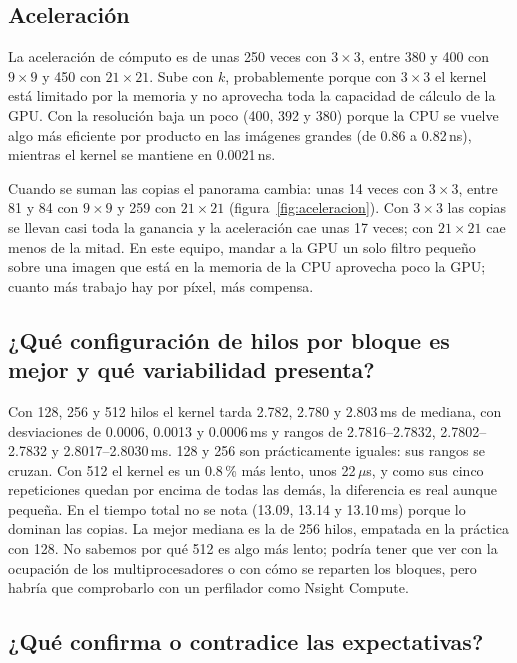 \documentclass[12pt]{article}
\begin{document}
\subsection{Aceleración}

La aceleración de cómputo es de unas 250 veces con $3\times3$, entre 380 y 400 con $9\times9$ y
450 con $21\times21$. Sube con $k$, probablemente porque con $3\times3$ el kernel está limitado
por la memoria y no aprovecha toda la capacidad de cálculo de la GPU. Con la resolución baja un
poco (400, 392 y 380) porque la CPU se vuelve algo más eficiente por producto en las imágenes
grandes (de 0.86 a 0.82\,ns), mientras el kernel se mantiene en 0.0021\,ns.

Cuando se suman las copias el panorama cambia: unas 14 veces con $3\times3$, entre 81 y 84 con
$9\times9$ y 259 con $21\times21$ (figura~\ref{fig:aceleracion}). Con $3\times3$ las copias se
llevan casi toda la ganancia y la aceleración cae unas 17 veces; con $21\times21$ cae menos de
la mitad. En este equipo, mandar a la GPU un solo filtro pequeño sobre una imagen que está en
la memoria de la CPU aprovecha poco la GPU; cuanto más trabajo hay por píxel, más compensa.

\subsection{¿Qué configuración de hilos por bloque es mejor y qué variabilidad presenta?}

Con 128, 256 y 512 hilos el kernel tarda 2.782, 2.780 y 2.803\,ms de mediana, con desviaciones
de 0.0006, 0.0013 y 0.0006\,ms y rangos de 2.7816--2.7832, 2.7802--2.7832 y 2.8017--2.8030\,ms.
128 y 256 son prácticamente iguales: sus rangos se cruzan. Con 512 el kernel es un 0.8\,\% más
lento, unos 22\,$\mu$s, y como sus cinco repeticiones quedan por encima de todas las demás, la
diferencia es real aunque pequeña. En el tiempo total no se nota (13.09, 13.14 y 13.10\,ms)
porque lo dominan las copias. La mejor mediana es la de 256 hilos, empatada en la práctica con
128. No sabemos por qué 512 es algo más lento; podría tener que ver con la ocupación de los
multiprocesadores o con cómo se reparten los bloques, pero habría que comprobarlo con un
perfilador como Nsight Compute.

\subsection{¿Qué confirma o contradice las expectativas?}
\end{document}
